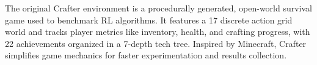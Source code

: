 
The original Crafter environment \cite{hafner2021benchmarking} is a procedurally generated, open-world survival game used to benchmark RL algorithms. It features a 17 discrete action grid world and tracks player metrics like inventory, health, and crafting progress, with 22 achievements organized in a 7-depth tech tree. Inspired by Minecraft, Crafter simplifies game mechanics for faster experimentation and results collection.

